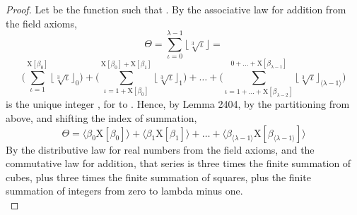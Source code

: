 \documentclass[preview]{standalone}
\begin{document}
\begin{proof}
    Let  be the function 
    such that .
    By the associative law for addition from the field axioms,
    \begin{equation*}
        \Theta
            =
        \sum_{\iota=0}^{\lambda - 1}
                \big \lfloor \sqrt[3] \iota \big \rfloor
            =
    \end{equation*}
    \begin{equation*}
        \Bigg(
            \sum_{ \iota = 1 }^{ \mathrm{X} [\beta_0] }
                \big \lfloor \sqrt[3] \iota \big \rfloor_0
        \Bigg)
            +
        \Bigg(
            \sum_{
                \iota = 1 + \mathrm{X}[\beta_0]
            }^{ 
                \mathrm{X}[\beta_0] + \mathrm{X}[\beta_1]
            }
                \big \lfloor \sqrt[3] \iota \big \rfloor_1
        \Bigg)
            +
        \dots
            +
        \Bigg(
            \sum_{
                \iota = 1 + \dots 
                    + 
                \mathrm{X}[\beta_{\lambda - 2}]
            }^{ 
                0 + \dots
                    +
                \mathrm{X}[\beta_{ \lambda - 1 }]
            }
                \big \lfloor \sqrt[3] \iota \big \rfloor_{ \langle \lambda - 1 \rangle }
        \Bigg)
    \end{equation*}
    \bm{$\big \lfloor \sqrt[3] \iota \big \rfloor_\tau$}
    is the unique integer \bm{$\beta_\tau$},
    for  to 
    \bm{$\big \langle \lambda - 1 \big \rangle$}.
    Hence, by Lemma 2404,
    by the partitioning from above, 
    and shifting the index of summation,
    \begin{equation*}
        \Theta
            =
        \Big \langle \beta_0 \mathrm{X} [\beta_0] \Big \rangle
            +
        \Big \langle \beta_1 \mathrm{X} [\beta_1] \Big \rangle
            + 
        \dots 
            +
        \Big \langle 
            \beta_{\langle \lambda - 1 \rangle}
            \mathrm{X} [\beta_{\langle \lambda - 1 \rangle}]
        \Big \rangle
    \end{equation*}
    By the distributive law for real numbers from the field axioms,
    and the commutative law for addition, that series is
    three times the finite summation of cubes,
    plus three times the finite summation of squares,
    plus the finite summation of integers from zero to lambda minus one.
    \begin{equation*}

\end{equation*}
\end{proof}
\end{document}
